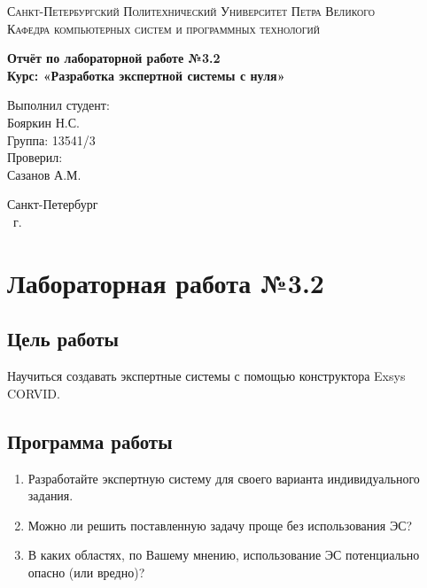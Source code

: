 \documentclass[14pt,a4paper,report]{report}
\begin{document}
\def\contentsname{Содержание}

\begin{titlepage}
	\begin{center}
		\textsc{Санкт-Петербургский Политехнический 
			Университет Петра Великого\\[5mm]
			Кафедра компьютерных систем и программных технологий}
		
		\vfill
		
		\textbf{Отчёт по лабораторной работе №3.2\\[3mm]
			Курс: «Разработка экспертной системы с нуля»\\[41mm]
		}
	\end{center}
	
	\hfill
	\begin{minipage}{.4\textwidth}
		Выполнил студент:\\[2mm] 
		Бояркин Н.С.\\
		Группа: 13541/3\\[5mm]
		
		Проверил:\\[2mm] 
		Сазанов А.М.
	\end{minipage}
	\vfill
	\begin{center}
		Санкт-Петербург\\ \the\year\ г.
	\end{center}
\end{titlepage}

\tableofcontents
\clearpage

\chapter{Лабораторная работа №3.2}

\section{Цель работы}

Научиться создавать экспертные системы с помощью конструктора Exsys CORVID.

\section{Программа работы}

\begin{enumerate}
	\item Разработайте экспертную систему для своего варианта индивидуального задания.
	\item Можно ли решить поставленную задачу проще без использования ЭС?
	\item В каких областях, по Вашему мнению, использование ЭС потенциально опасно (или вредно)?
\end{enumerate}
\end{document}
